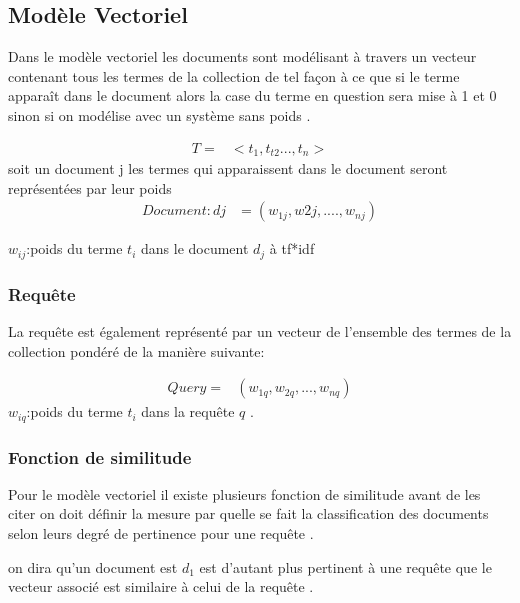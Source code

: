 \documentclass[12pt,a4paper,oneside]{article}
\begin{document}
\newpage
\subsection{Modèle Vectoriel}
Dans le modèle vectoriel les documents sont modélisant à travers un vecteur contenant tous les termes de la collection de tel façon à ce que si le  terme apparaît dans le document alors la case du terme en question sera mise  à 1 et 0 sinon si on modélise avec un système sans poids .


\begin{equation}
\begin{split}
T=& <t_{1},t_{t2}...,t_{n}>
\end{split}           
\end{equation}
soit un document j les termes qui apparaissent dans le document seront représentées par leur poids
\begin{equation}
\begin{split}
Document : dj &= (w_{1j},w{2j},....,w_{nj})
\end{split}   
\end{equation}

$w_{ij}$:poids du terme $t_{i}$ dans le document $d_{j}$ à tf*idf


\subsubsection*{Requête}
La requête est également représenté par un vecteur de l'ensemble des termes de la collection pondéré de la manière suivante:

\begin{equation}
\begin{split}
Query=&(w_{1q},w_{2q},...,w_{nq})
\end{split}
\end{equation}
$w_{iq}$:poids du terme $t_{i}$ dans la requête $q$ .


\subsubsection*{Fonction de similitude}
Pour le modèle vectoriel il existe plusieurs fonction de similitude avant de les citer on doit définir la mesure par quelle se fait la classification des documents selon leurs degré de pertinence pour une requête .

on dira qu'un document est $d_{1}$ est d’autant plus pertinent à une requête que le  vecteur 
associé est similaire à celui de la requête .
\end{document}
